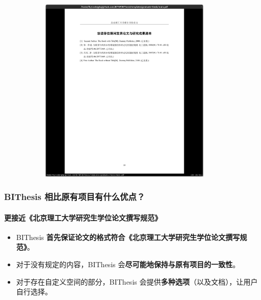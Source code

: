 \documentclass[
  aspectratio=169,
  presentation,
  titlegraphic=./images/bit.png,
  framelogo=./images/bit.png
]{bitbeamer}
\begin{document}
\begin{frame}[t]
\begin{figure}
\begin{subfigure}{0.45\textwidth}
      \includegraphics[width=0.9\textwidth]{images/7-2.png}
    \end{subfigure}
  \end{figure}
\end{frame}


\begin{frame}[t]
  \frametitle{BIThesis 相比原有项目有什么优点？}
  \framesubtitle{更接近《北京理工大学研究生学位论文撰写规范》}

  \begin{itemize}
    \item BIThesis \textbf{首先保证论文的格式符合《北京理工大学研究生学位论文撰写规范》}。
    \item 对于没有规定的内容，BIThesis 会\textbf{尽可能地保持与原有项目的一致性}。
    \item 对于存在自定义空间的部分，BIThesis 会提供\textbf{多种选项}（以及文档），让用户自行选择。
  \end{itemize}
  

\end{frame}
\end{document}
